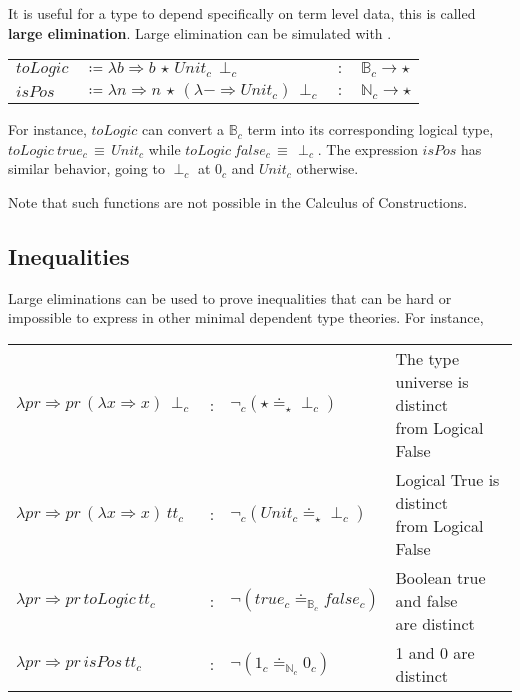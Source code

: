 
It is useful for a type to depend specifically on term level data, this is called \textbf{large elimination}.
Large elimination can be simulated with \tit{}.

\begin{tabular}{llll}
  $toLogic$ & $\coloneqq\lambda b\Rightarrow b\,\star\,Unit_{c}\,\perp_{c}$ & $:$ & $\mathbb{B}_{c}\rightarrow\star$\tabularnewline
  $isPos$ & $\coloneqq\lambda n\Rightarrow n\,\star\,(\lambda-\Rightarrow Unit_{c})\,\perp_{c}$ & $:$ & $\mathbb{N}_{c}\rightarrow\star$\tabularnewline
\end{tabular}
  
For instance, $toLogic$ can convert a $\mathbb{B}_{c}$ term into its corresponding logical type, $toLogic\ true_{c}\,\equiv\, Unit_{c}$ while $toLogic\ false_{c}\, \equiv\, \perp_{c}$.
The expression $isPos$ has similar behavior, going to $\perp_{c}$ at $0_{c}$ and $Unit_{c}$ otherwise.

Note that such functions are not possible in the Calculus of Constructions.

\subsection{Inequalities}

Large eliminations can be used to prove inequalities that can be hard or impossible to express in other minimal dependent type theories. %
For instance, 

\begin{tabular}{lcll}
  $\lambda pr\Rightarrow pr\,\left(\lambda x\Rightarrow x\right)\,\perp_{c}$ & : & $\lnot_{c}(\star\doteq_{\star}\perp_{c})$ & \makecell{The type universe is distinct\\ from Logical False}\tabularnewline
  $\lambda pr\Rightarrow pr\,\left(\lambda x\Rightarrow x\right)\,tt_{c}$ & : & $\lnot_{c}(Unit_{c}\doteq_{\star}\perp_{c})$ &  \makecell{Logical True is distinct\\ from Logical False}\tabularnewline
  $\lambda pr\Rightarrow pr\,toLogic\,tt_{c}$ & : & $\lnot (true_{c}\doteq_{\mathbb{B}_{c}}false_{c})$ &  \makecell{Boolean true and false\\ are distinct}\tabularnewline
  $\lambda pr\Rightarrow pr\,isPos\,tt_{c}$ & : & $\lnot (1_{c}\doteq_{\mathbb{N}_{c}}0_{c})$ & 1 and 0 are distinct\tabularnewline
\end{tabular}
  
